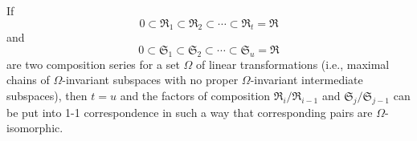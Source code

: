 If
$$0 \subset \mathfrak{R}_1 \subset \mathfrak{R}_2 \subset \cdots \subset \mathfrak{R}_t = \mathfrak{R}$$
and
$$0 \subset \mathfrak{S}_1 \subset \mathfrak{S}_2 \subset \cdots \subset \mathfrak{S}_u = \mathfrak{R}$$
are two composition series for a set $\Omega$ of linear transformations (i.e., maximal chains of $\Omega$-invariant subspaces with no proper $\Omega$-invariant intermediate subspaces), then $t = u$ and the factors of composition $\mathfrak{R}_i/\mathfrak{R}_{i-1}$ and $\mathfrak{S}_j/\mathfrak{S}_{j-1}$ can be put into 1-1 correspondence in such a way that corresponding pairs are $\Omega$-isomorphic.
